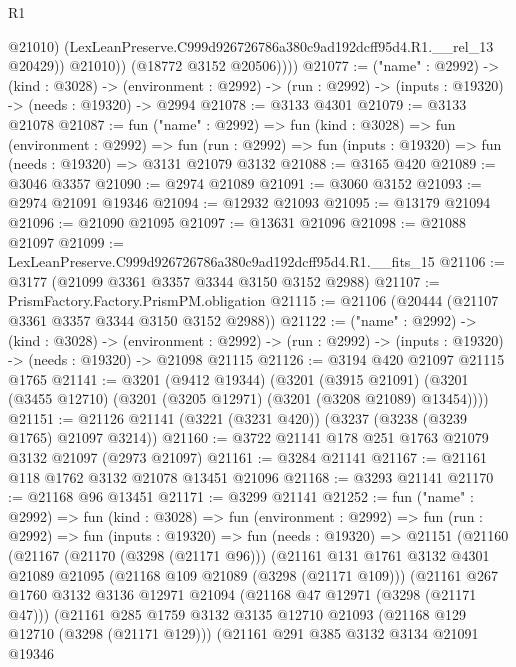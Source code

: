\begin{lexlean}{R1}
\begin{coremodule}
                  @21010)
                (LexLeanPreserve.C999d926726786a380c9ad192dcff95d4.R1.__rel_13 @20429))
              @21010))
          (@18772 @3152 @20506))))
@21077 := ("name" : @2992) ->
  (kind : @3028) ->
  (environment : @2992) -> (run : @2992) -> (inputs : @19320) -> (needs : @19320) -> @2994
@21078 := @3133 @4301
@21079 := @3133 @21078
@21087 := fun ("name" : @2992) =>
  fun (kind : @3028) =>
  fun (environment : @2992) =>
  fun (run : @2992) => fun (inputs : @19320) => fun (needs : @19320) => @3131 @21079 @3132
@21088 := @3165 @420
@21089 := @3046 @3357
@21090 := @2974 @21089
@21091 := @3060 @3152
@21093 := @2974 @21091 @19346
@21094 := @12932 @21093
@21095 := @13179 @21094
@21096 := @21090 @21095
@21097 := @13631 @21096
@21098 := @21088 @21097
@21099 := LexLeanPreserve.C999d926726786a380c9ad192dcff95d4.R1.__fits_15
@21106 := @3177 (@21099 @3361 @3357 @3344 @3150 @3152 @2988)
@21107 := PrismFactory.Factory.PrismPM.obligation
@21115 := @21106 (@20444 (@21107 @3361 @3357 @3344 @3150 @3152 @2988))
@21122 := ("name" : @2992) ->
  (kind : @3028) ->
  (environment : @2992) -> (run : @2992) -> (inputs : @19320) -> (needs : @19320) -> @21098 @21115
@21126 := @3194 @420 @21097 @21115 @1765
@21141 := @3201
    (@9412 @19344)
    (@3201
      (@3915 @21091)
      (@3201 (@3455 @12710) (@3201 (@3205 @12971) (@3201 (@3208 @21089) @13454))))
@21151 := @21126 @21141 (@3221 (@3231 @420)) (@3237 (@3238 (@3239 @1765) @21097 @3214))
@21160 := @3722 @21141 @178 @251 @1763 @21079 @3132 @21097 (@2973 @21097)
@21161 := @3284 @21141
@21167 := @21161 @118 @1762 @3132 @21078 @13451 @21096
@21168 := @3293 @21141
@21170 := @21168 @96 @13451
@21171 := @3299 @21141
@21252 := fun ("name" : @2992) =>
  fun (kind : @3028) =>
  fun (environment : @2992) =>
  fun (run : @2992) =>
  fun (inputs : @19320) =>
  fun (needs : @19320) =>
  @21151
    (@21160
      (@21167
        (@21170 (@3298 (@21171 @96)))
        (@21161
          @131
          @1761
          @3132
          @4301
          @21089
          @21095
          (@21168 @109 @21089 (@3298 (@21171 @109)))
          (@21161
            @267
            @1760
            @3132
            @3136
            @12971
            @21094
            (@21168 @47 @12971 (@3298 (@21171 @47)))
            (@21161
              @285
              @1759
              @3132
              @3135
              @12710
              @21093
              (@21168 @129 @12710 (@3298 (@21171 @129)))
              (@21161
                @291
                @385
                @3132
                @3134
                @21091
                @19346

\end{coremodule}
\end{lexlean}
